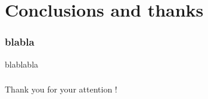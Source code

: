 \documentclass{beamer}
\begin{document}
\section{Conclusions and thanks}
\begin{frame}
	\frametitle{blabla}

    \begin{block}{blablabla}
    \end{block}
\end{frame}

\begin{frame}
	\frametitle{}

    \begin{center}
    \Large{Thank you for your attention !}
    \end{center}
\end{frame}
	
\end{document}
